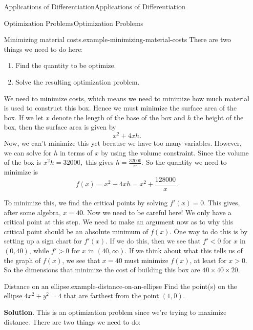 \documentclass[10pt,]{book}
\numberwithin{equation}{section}
\begin{document}
\begin{chapterptx}{Applications of Differentiation}{}{Applications of Differentiation}{}{}
\begin{sectionptx}{Optimization Problems}{}{Optimization Problems}{}{}
\begin{example}{Minimizing material costs.}{example-minimizing-material-costs}
\hypertarget{p-359}{}%
There are two things we need to do here: \leavevmode%
\begin{enumerate}
\item\hypertarget{li-24}{}Find the quantity to be optimize.%
\item\hypertarget{li-25}{}Solve the resulting optimization problem.%
\end{enumerate}
 We need to minimize costs, which means we need to minimize how much material is used to construct this box. Hence we must minimize the surface area of the box. If we let \(x\) denote the length of the base of the box and \(h\) the height of the box, then the surface area is given by%
\begin{equation*}
x^{2} + 4xh.
\end{equation*}
Now, we can't minimize this yet because we have too many variables. However, we can solve for \(h\) in terms of \(x\) by using the volume constraint. Since the volume of the box is \(x^{2}h = 32000,\) this gives \(h = \frac{32000}{x^{2}}.\) So the quantity we need to minimize is%
\begin{equation*}
f(x) = x^{2} + 4xh = x^{2} + \frac{128000}{x}.
\end{equation*}
%
\par
\hypertarget{p-360}{}%
To minimize this, we find the critical points by solving \(f'(x) = 0\). This gives, after some algebra, \(x = 40\). Now we need to be careful here! We only have a critical point at this step. We need to make an argument now as to why this critical point should be an absolute minimum of \(f(x)\). One way to do this is by setting up a sign chart for \(f'(x)\). If we do this, then we see that \(f' < 0\) for \(x\) in \((0,40)\), while \(f' > 0\) for \(x\) in \((40,\infty)\). If we think about what this tells us of the graph of \(f(x)\), we see that \(x=40\) must minimize \(f(x)\), at least for \(x > 0\). So the dimensions that minimize the cost of building this box are \(40\times40\times20\).%
\end{example}
\begin{example}{Distance on an ellipse.}{example-distance-on-an-ellipse}%
\hypertarget{p-361}{}%
Find the point(s) on the ellipse \(4x^{2} + y^{2} = 4\) that are farthest from the point \((1,0)\).%
\par\smallskip%
\noindent\textbf{Solution}.\hypertarget{solution-80}{}\quad%
\hypertarget{p-362}{}%
This is an optimization problem since we're trying to maximize distance. There are two things we need to do: \leavevmode%
\begin{enumerate}

\end{enumerate}
\end{example}
\end{sectionptx}
\end{chapterptx}
\end{document}

